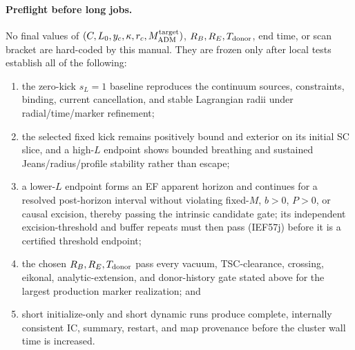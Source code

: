 \paragraph{Preflight before long jobs.}
No final values of \((C,L_0,y_c,\kappa,r_c,M_{\rm ADM}^{\rm target})\),
\(R_B,R_E,T_{\rm donor}\), end time, or scan bracket are hard-coded by this
manual.  They are frozen only after local tests establish all of the
following:
\begin{enumerate}
\item the zero-kick \(s_L=1\) baseline reproduces the continuum sources,
      constraints, binding, current cancellation, and stable Lagrangian
      radii under radial/time/marker refinement;
\item the selected fixed kick remains positively bound and exterior on its
      initial SC slice, and a high-\(L\) endpoint shows bounded breathing and
      sustained Jeans/radius/profile stability rather than escape;
\item a lower-\(L\) endpoint forms an EF apparent horizon and continues for a
      resolved post-horizon interval without violating fixed-\(M\), \(b>0\),
      \(P>0\), or causal excision, thereby passing the intrinsic candidate
      gate; its independent excision-threshold and buffer repeats must then
      pass (IEF57j) before it is a certified threshold endpoint;
\item the chosen \(R_B,R_E,T_{\rm donor}\) pass every vacuum, TSC-clearance,
      crossing, eikonal, analytic-extension, and donor-history gate stated
      above for the largest production marker realization; and
\item short initialize-only and short dynamic runs produce complete,
      internally consistent IC, summary, restart, and map provenance before
      the cluster wall time is increased.
\end{enumerate}

